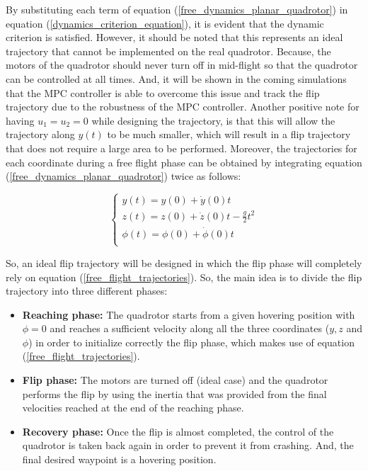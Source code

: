 \documentclass{thesisreport}
\begin{document}
By substituting each term of equation (\ref{free_dynamics_planar_quadrotor}) in equation (\ref{dynamics_criterion_equation}), it is evident that the dynamic criterion is satisfied. However, it should be noted that this represents an ideal trajectory that cannot be implemented on the real quadrotor. Because, the motors of the quadrotor should never turn off in mid-flight so that the quadrotor can be controlled at all times. 
And, it will be shown in the coming simulations that the MPC controller is able to overcome this issue and track the flip trajectory due to the robustness of the MPC controller. Another positive note for having $u_1=u_2=0$ while designing the trajectory, is that this will allow the trajectory along $y(t)$ to be much smaller, which will result in a flip trajectory that does not require a large area to be performed.
Moreover, the trajectories for each coordinate during a free flight phase can be obtained by integrating equation (\ref{free_dynamics_planar_quadrotor}) twice as follows:

\begin{equation}\label{free_flight_trajectories}
 \begin{cases} 
       y(t) = y(0) + \dot{y}(0)t \\
       z(t) = z(0) +\dot{z}(0)t - \frac{g}{2}t^2  \\
       \phi(t) = \phi(0) + \dot{\phi}(0)t \\
   \end{cases}
\end{equation}

So, an ideal flip trajectory will be designed in which the flip phase will completely rely on equation (\ref{free_flight_trajectories}). So, the main idea is to divide the flip trajectory into three different phases: 

\begin{itemize}
	\item [] \textbf{Reaching phase:} The quadrotor starts from a given hovering position with $\phi=0$ and reaches a sufficient velocity along all the three coordinates ($y,z$ and $\phi$) in order to initialize correctly the flip phase, which makes use of equation (\ref{free_flight_trajectories}).
	\item [] \textbf{Flip phase: } The motors are turned off (ideal case) and the quadrotor performs the flip by using the inertia that was provided from the final velocities reached at the end of the reaching phase.
	\item [] \textbf{Recovery phase: } Once the flip is almost completed, the control of the quadrotor is taken back again in order to prevent it from crashing. And, the final desired waypoint is a hovering position.  
\end{itemize}
\end{document}
